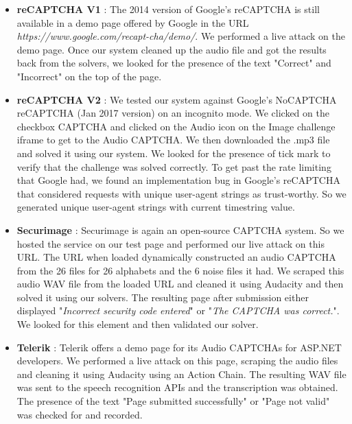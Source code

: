 \begin{itemize}
\item \textbf{reCAPTCHA V1} : The 2014 version of Google's reCAPTCHA is still available in a demo page offered by Google in the URL \textit{https://www.google.com/recapt\newline-cha/demo/}. We performed a live attack on the demo page. Once our system cleaned up the audio file and got the results back from the solvers, we looked for the presence of the text "Correct" and "Incorrect" on the top of the page.

\item \textbf{reCAPTCHA V2} : We tested our system against Google's NoCAPTCHA reCAPTCHA (Jan 2017 version) on an incognito mode. We clicked on the checkbox CAPTCHA and clicked on the Audio icon on the Image challenge iframe to get to the Audio CAPTCHA. We then downloaded the .mp3 file and solved it using our system. We looked for the presence of tick mark to verify that the challenge was solved correctly. To get past the rate limiting that Google had, we found an implementation bug in Google's reCAPTCHA that considered requests with unique user-agent strings as trust-worthy. So we generated unique user-agent strings with current timestring value.

\item \textbf{Securimage} : Securimage is again an open-source CAPTCHA system. So we hosted the service on our test page and performed our live attack on this URL. The URL when loaded dynamically constructed an audio CAPTCHA from the 26 files for 26 alphabets and the 6 noise files it had. We scraped this audio WAV file from the loaded URL and cleaned it using Audacity and then solved it using our solvers. The resulting page after submission either displayed "\textit{Incorrect security code entered}" or "\textit{The CAPTCHA was correct.}". We looked for this element and then validated our solver.

\item \textbf{Telerik} : Telerik offers a demo page for its Audio CAPTCHAs for ASP.NET developers. We performed a live attack on this page, scraping the audio files and cleaning it using Audacity using an Action Chain. The resulting WAV file was sent to the speech recognition APIs and the transcription was obtained. The presence of the text "Page submitted successfully" or "Page not valid" was checked for and recorded.
\end{itemize}